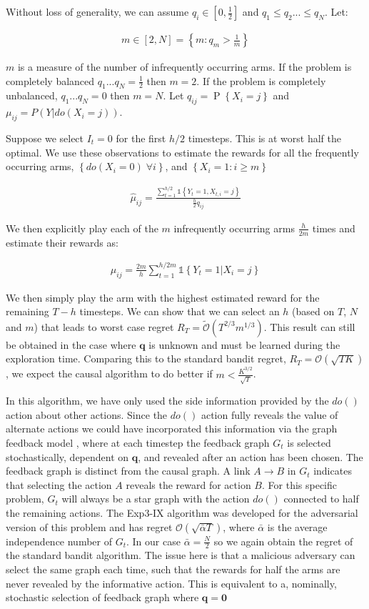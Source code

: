 \documentclass[11pt,a4paper]{article}
\newcommand{\set}[1]{\left\{#1\right\}}
\newcommand{\ind}[1]{\mathds{1}\!\!\set{#1}}
\newcommand{\eqn}[1]{\begin{align}#1\end{align}}
\newcommand{\bigo}[1]{\mathcal{O}\left( #1 \right)}
\newcommand{\bigotilde}[1]{\tilde{\mathcal{O}}\left( #1 \right)}
\renewcommand{\P}[1]{\operatorname{P}\left\{#1\right\}}
\begin{document}
Without loss of generality, we can assume $q_i \in [0,\frac{1}{2}]$ and $q_1 \leq q_2 ... \leq q_N$. Let:

\eqn {
m \in [2,N] = \set{m:q_m > \frac{1}{m}}
}

$m$ is a measure of the number of infrequently occurring arms. If the problem is completely balanced $q_1...q_N = \frac{1}{2}$ then $m = 2$. If the problem is completely unbalanced, $q_1...q_N = 0$ then $m=N$.  Let $q_{ij} = \P{X_i = j}$ and $\mu_{ij} = P(Y|do(X_i = j))$.


Suppose we select $I_t = 0$ for the first $h/2$ timesteps. This is at worst half the optimal. We use these observations to estimate the rewards for all the frequently occurring arms, $\set{do(X_i = 0) \; \forall i}$, and $\set{X_i = 1:i \geq m}$ 

\eqn {
\hat{\mu}_{ij} = \frac{\sum_{t=1}^{h/2}\ind{Y_t=1,X_{t,i}=j}}{\frac{h}{2}q_{ij}}
}

We then explicitly play each of the $m$ infrequently occurring arms $\frac{h}{2m}$ times and estimate their rewards as:

\eqn {
\hat{\mu}_{ij} = \frac{2m}{h}\sum_{t = 1}^{h/2m}\ind{Y_t = 1|X_i=j}
}

We then simply play the arm with the highest estimated reward for the remaining $T-h$ timesteps. We can show that we can select an $h$ (based on $T$, $N$ and $m$) that leads to worst case regret $R_T = \bigotilde{T^{2/3}m^{1/3}}$. This result can still be obtained in the case where $\boldsymbol{q}$ is unknown and must be learned during the exploration time. Comparing this to the standard bandit regret, $R_T = \bigo{\sqrt{TK}}$, we expect the causal algorithm to do better if $m < \frac{K^{3/2}}{\sqrt{T}}$.

In this algorithm, we have only used the side information provided by the $do()$ action about other actions. Since the $do()$ action fully reveals the value of alternate actions we could have incorporated this information via the graph feedback model \cite{}, where at each timestep the feedback graph $G_t$ is selected stochastically, dependent on $\boldsymbol{q}$, and revealed after an action has been chosen. The feedback graph is distinct from the causal graph. A link $A \rightarrow B$ in $G_t$ indicates that selecting the action $A$ reveals the reward for action $B$. For this specific problem, $G_t$ will always be a star graph with the action $do()$ connected to half the remaining actions. The Exp3-IX algorithm \cite{Kocak2014} was developed for the adversarial version of this problem and has regret $\bigo{\sqrt{\bar{\alpha}T}}$, where $\bar{\alpha}$ is the average independence number of $G_t$. In our case $\bar{\alpha} = \frac{N}{2}$ so we again obtain the regret of the standard bandit algorithm. The issue here is that a malicious adversary can select the same graph each time, such that the rewards for half the arms are never revealed by the informative action. This is equivalent to a, nominally, stochastic selection of feedback graph where $\boldsymbol{q} = \boldsymbol{0}$
\end{document}
